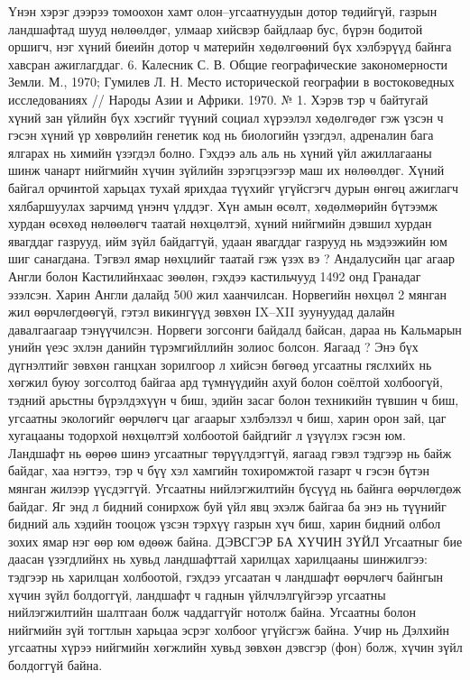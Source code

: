 Үнэн хэрэг дээрээ томоохон хамт олон–угсаатнуудын дотор төдийгүй, газрын ландшафтад шууд нөлөөлдөг, улмаар хийсвэр байдлаар бус, бүрэн бодитой оршигч, нэг хүний биеийн дотор ч материйн хөдөлгөөний бүх хэлбэрүүд байнга хавсран ажиглагддаг. 6. Калесник С. В. Общие географические закономерности Земли. М., 1970; Гумилев Л. Н. Место исторической географии в востоковедных исследованиях // Народы Азии и Африки. 1970. № 1.
Хэрэв тэр ч байтугай хүний зан үйлийн бүх хэсгийг түүний социал хүрээлэл хөдөлгөдөг гэж үзсэн ч гэсэн хүний үр хөврөлийн генетик код нь биологийн үзэгдэл, адреналин бага ялгарах нь химийн үзэгдэл болно. Гэхдээ аль аль нь хүний үйл ажиллагааны шинж чанарт нийгмийн хүчин зүйлийн зэрэгцээгээр маш их нөлөөлдөг.
Хүний байгал орчинтой харьцах тухай ярихдаа түүхийг үгүйсгэгч дурын өнгөц ажиглагч хялбаршуулах зарчимд үнэнч үлддэг. Хүн амын өсөлт, хөдөлмөрийн бүтээмж хурдан өсөхөд нөлөөлөгч таатай нөхцөлтэй, хүний нийгмийн дэвшил хурдан явагддаг газрууд, ийм зүйл байдаггүй, удаан явагддаг газрууд нь мэдээжийн юм шиг санагдана. Тэгвэл ямар нөхцлийг таатай гэж үзэх вэ ? Андалусийн цаг агаар Англи болон Кастилийнхаас зөөлөн, гэхдээ кастильчууд 1492 онд Гранадаг эзэлсэн. Харин Англи далайд 500 жил хаанчилсан. Норвегийн нөхцөл 2 мянган жил өөрчлөгдөөгүй, гэтэл викингүүд зөвхөн IX–XII зуунуудад далайн давалгаагаар тэнүүчилсэн. Норвеги зогсонги байдалд байсан, дараа нь Кальмарын унийн үеэс эхлэн данийн түрэмгийллийн золиос болсон. Яагаад ?
Энэ бүх дүгнэлтийг зөвхөн ганцхан зорилгоор л хийсэн бөгөөд угсаатны гяслхийх нь хөгжил буюу зогсолтод байгаа ард түмнүүдийн ахуй болон соёлтой холбоогүй, тэдний арьстны бүрэлдэхүүн ч биш, эдийн засаг болон техникийн түвшин ч биш, угсаатны экологийг өөрчлөгч цаг агаарыг хэлбэлзэл ч биш, харин орон зай, цаг хугацааны тодорхой нөхцөлтэй холбоотой байдгийг л үзүүлэх гэсэн юм. Ландшафт нь өөрөө шинэ угсаатныг төрүүлдэггүй, яагаад гэвэл тэдгээр нь байж байдаг, хаа нэгтээ, тэр ч бүү хэл хамгийн тохиромжтой газарт ч гэсэн бүтэн мянган жилээр үүсдэггүй. Угсаатны нийлэгжилтийн бүсүүд нь байнга өөрчлөгдөж байдаг. Яг энд л бидний сонирхож буй үйл явц эхэлж байгаа ба энэ нь түүнийг бидний аль хэдийн тооцож үзсэн тэрхүү газрын хүч биш, харин бидний олбол зохих ямар нэг өөр юм өдөөж байна.
ДЭВСГЭР БА ХҮЧИН ЗҮЙЛ
Угсаатныг бие даасан үзэгдлийнх нь хувьд ландшафттай харилцах харилцааны шинжилгээ: тэдгээр нь харилцан холбоотой, гэхдээ угсаатан ч ландшафт өөрчлөгч байнгын хүчин зүйл болдоггүй, ландшафт ч гаднын үйлчлэлгүйгээр угсаатны нийлэгжилтийн шалтгаан болж чаддаггүйг нотолж байна. Угсаатны болон нийгмийн зүй тогтлын харьцаа эсрэг холбоог үгүйсгэж байна. Учир нь Дэлхийн угсаатны хүрээ нийгмийн хөгжлийн хувьд зөвхөн дэвсгэр (фон) болж, хүчин зүйл болдоггүй байна.
